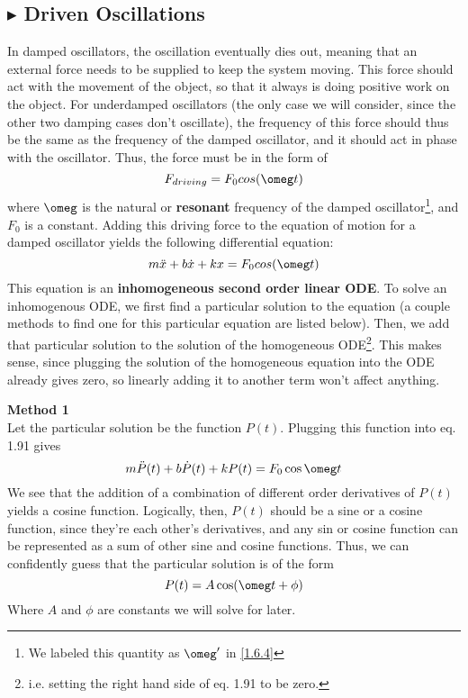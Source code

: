 \subsection{\color{Orchid} $\blacktriangleright$ \color{black} Driven Oscillations}
In damped oscillators, the oscillation eventually dies out, meaning that an external force needs to be supplied to keep the system moving. This force should act with the movement of the object, so that it always is doing positive work on the object. For underdamped oscillators (the only case we will consider, since the other two damping cases don't oscillate), the frequency of this force should thus be the same as the frequency of the damped oscillator, and it should act in phase with the oscillator. Thus, the force must be in the form of 
\begin{equation}
    F_{driving} = F_0 cos(\omeg t)
\end{equation}
\noindent where $\omeg$ is the natural or \textbf{resonant} frequency of the damped oscillator\footnote{We labeled this quantity as $\omeg'$ in \ref{1.6.4}}, and $F_0$ is a constant. Adding this driving force to the equation of motion for a damped oscillator yields the following differential equation:
\begin{equation}
    m\ddot{x} + b\dot{x} + kx = F_0 cos(\omeg t)
\end{equation}
\noindent This equation is an \textbf{inhomogeneous second order linear ODE}. To solve an inhomogenous ODE, we first find a particular solution to the equation (a couple methods to find one for this particular equation are listed below). Then, we add that particular solution to the solution of the homogeneous ODE\footnote{i.e. setting the right hand side of eq. 1.91 to be zero.}. This makes sense, since plugging the solution of the homogeneous equation into the ODE already gives zero, so linearly adding it to another term won't affect anything.

\noindent \textbf{Method 1} \\
\noindent Let the particular solution be the function $P(t)$. Plugging this function into eq. 1.91 gives
\begin{equation}
    m\ddot{P}(t) + b\dot{P}(t) + kP(t) = F_0\cos{\omeg t} 
\end{equation}
\noindent We see that the addition of a combination of different order derivatives of $P(t)$ yields a cosine function. Logically, then, $P(t)$ should be a sine or a cosine function, since they're each other's derivatives, and any sin or cosine function can be represented as a sum of other sine and cosine functions. Thus, we can confidently guess that the particular solution is of the form
\begin{equation*}
    P(t) = A\cos(\omeg t + \phi)
\end{equation*}
\noindent Where $A$ and $\phi$ are constants we will solve for later.


